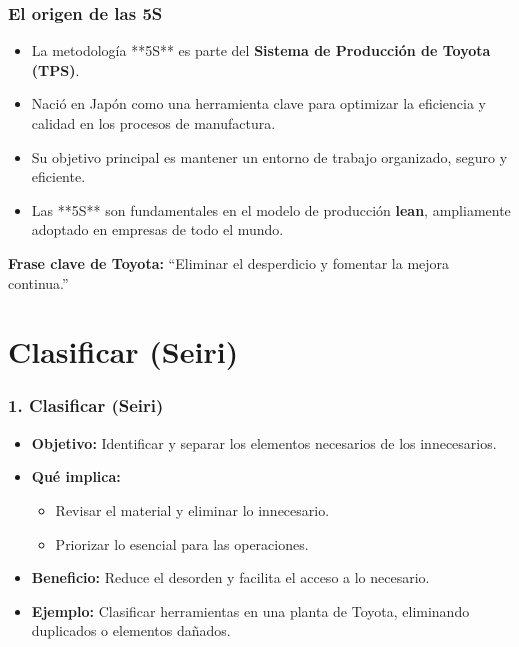 \documentclass{beamer}
\begin{document}
\begin{frame}
\frametitle{El origen de las 5S}
\begin{itemize}
    \item La metodología **5S** es parte del \textbf{Sistema de Producción de Toyota (TPS)}.
    \item Nació en Japón como una herramienta clave para optimizar la eficiencia y calidad en los procesos de manufactura.
    \item Su objetivo principal es mantener un entorno de trabajo organizado, seguro y eficiente.
    \item Las **5S** son fundamentales en el modelo de producción \textbf{lean}, ampliamente adoptado en empresas de todo el mundo.
\end{itemize}

\vspace{0.5cm}
\textbf{Frase clave de Toyota:} “Eliminar el desperdicio y fomentar la mejora continua.”
\end{frame}

\section{Clasificar (Seiri)}
\begin{frame}
\frametitle{1. Clasificar (Seiri)}
\begin{itemize}
    \item \textbf{Objetivo:} Identificar y separar los elementos necesarios de los innecesarios.
    \item \textbf{Qué implica:}
        \begin{itemize}
            \item Revisar el material y eliminar lo innecesario.
            \item Priorizar lo esencial para las operaciones.
        \end{itemize}
    \item \textbf{Beneficio:} Reduce el desorden y facilita el acceso a lo necesario.
    \item \textbf{Ejemplo:} Clasificar herramientas en una planta de Toyota, eliminando duplicados o elementos dañados.
\end{itemize}
\end{frame}
\end{document}
